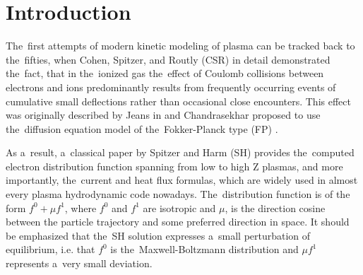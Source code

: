 \section{Introduction}
\label{sec:Intro}

The~first attempts of modern kinetic modeling of plasma can be tracked back 
to the~fifties, when Cohen, Spitzer, and Routly (CSR) \cite{CSR_1950} 
in detail demonstrated the~fact, that in the~ionized gas the~effect of 
Coulomb collisions between electrons and ions predominantly results 
from frequently occurring events of cumulative small deflections 
rather than occasional close encounters. This effect was originally described
by Jeans in \cite{Jeans_BOOK1929} and 
Chandrasekhar \cite{Chandrasekhar_RMP1943} 
proposed to use the~diffusion equation model of the~Fokker-Planck type (FP) 
\cite{Planck_1917}.

As a~result, a~classical paper by Spitzer and Harm (SH) 
\cite{SpitzerHarm_PR1953} provides the~computed electron distribution function
spanning from low to high Z plasmas, and more importantly, the~current and 
heat flux formulas, which are widely used in almost every plasma hydrodynamic
code nowadays.
The~distribution function is of the form $f^0+\mu f^1$, where $f^0$ and $f^1$ 
are isotropic and $\mu$, is the direction cosine between the particle 
trajectory and some preferred direction in space. It should be emphasized that
the~SH solution expresses a~small perturbation of equilibrium, i.e. that 
$f^0$ is the~Maxwell-Boltzmann distribution and $\mu f^1$ represents 
a~very small deviation.

